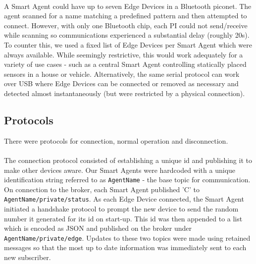 \paragraph{}
A Smart Agent could have up to seven Edge Devices in a Bluetooth piconet. The agent scanned for a name matching a predefined pattern and then attempted to connect. However, with only one Bluetooth chip, each PI could not send/receive while scanning so communications experienced a substantial delay (roughly 20s). To counter this, we used a fixed list of Edge Devices per Smart Agent which were always available. While seemingly restrictive, this would work adequately for a variety of use cases - such as a central Smart Agent controlling statically placed sensors in a house or vehicle. Alternatively, the same serial protocol can work over USB where Edge Devices can be connected or removed as necessary and detected almost instantaneously (but were restricted by a physical connection).


\subsection{Protocols}

There were protocols for connection, normal operation and disconnection.

\paragraph{} %
The connection protocol consisted of establishing a unique id and publishing it to make other devices aware. Our Smart Agents were hardcoded with a unique identification string referred to as \verb|AgentName| - the base topic for communication. On connection to the broker, each Smart Agent published 'C' to \verb|AgentName/private/status|. As each Edge Device connected, the Smart Agent initiated a handshake protocol to prompt the new device to send the random number it generated for its id on start-up. This id was then appended to a list which is encoded as JSON and published on the broker under \verb|AgentName/private/edge|. Updates to these two topics were made using retained messages so that the most up to date information was immediately sent to each new subscriber.

